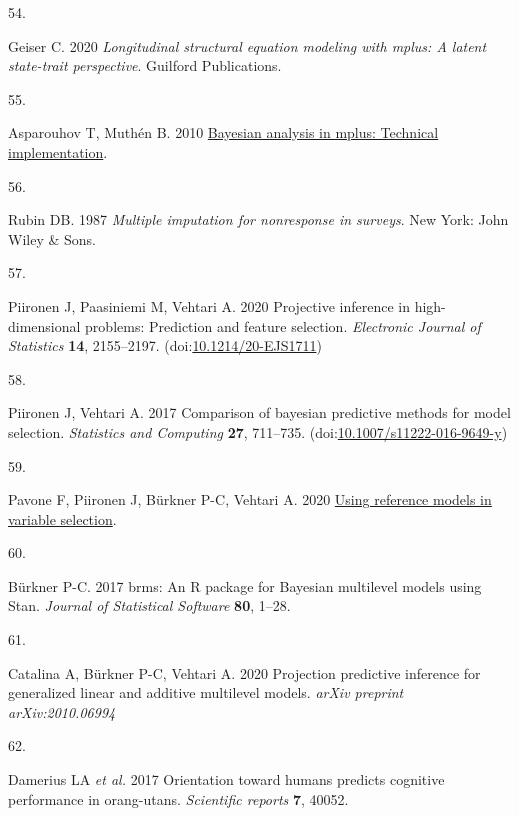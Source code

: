 \documentclass[
  man,floatsintext]{apa6}
\newlength{\cslhangindent}
\newlength{\csllabelwidth}
\newenvironment{CSLReferences}[2] %
 {\begin{list}{}{%
  \setlength{\itemindent}{0pt}
  \setlength{\leftmargin}{0pt}
  \setlength{\parsep}{0pt}
  \ifodd #1
   \setlength{\leftmargin}{\cslhangindent}
   \setlength{\itemindent}{-1\cslhangindent}
  \fi
  \setlength{\itemsep}{#2\baselineskip}}}
 {\end{list}}
\newcommand{\CSLLeftMargin}[1]{\parbox[t]{\csllabelwidth}{\strut#1\strut}}
\newcommand{\CSLRightInline}[1]{\parbox[t]{\linewidth - \csllabelwidth}{\strut#1\strut}}
\begin{document}
\begin{CSLReferences}{0}{1}
\CSLLeftMargin{54. }%
\CSLRightInline{Geiser C. 2020 \emph{Longitudinal structural equation modeling with mplus: A latent state-trait perspective}. Guilford Publications. }

\CSLLeftMargin{55. }%
\CSLRightInline{Asparouhov T, Muthén B. 2010 \href{http://www.statmodel.com/download/Bayes3.pdf}{Bayesian analysis in mplus: Technical implementation}. }

\CSLLeftMargin{56. }%
\CSLRightInline{Rubin DB. 1987 \emph{Multiple imputation for nonresponse in surveys}. New York: John Wiley \& Sons. }

\CSLLeftMargin{57. }%
\CSLRightInline{Piironen J, Paasiniemi M, Vehtari A. 2020 {Projective inference in high-dimensional problems: Prediction and feature selection}. \emph{Electronic Journal of Statistics} \textbf{14}, 2155--2197. (doi:\href{https://doi.org/10.1214/20-EJS1711}{10.1214/20-EJS1711})}

\CSLLeftMargin{58. }%
\CSLRightInline{Piironen J, Vehtari A. 2017 Comparison of bayesian predictive methods for model selection. \emph{Statistics and Computing} \textbf{27}, 711--735. (doi:\href{https://doi.org/10.1007/s11222-016-9649-y}{10.1007/s11222-016-9649-y})}

\CSLLeftMargin{59. }%
\CSLRightInline{Pavone F, Piironen J, Bürkner P-C, Vehtari A. 2020 \href{https://arxiv.org/abs/2004.13118}{Using reference models in variable selection}. }

\CSLLeftMargin{60. }%
\CSLRightInline{Bürkner P-C. 2017 {brms}: An {R} package for {Bayesian} multilevel models using {Stan}. \emph{Journal of Statistical Software} \textbf{80}, 1--28.}

\CSLLeftMargin{61. }%
\CSLRightInline{Catalina A, Bürkner P-C, Vehtari A. 2020 Projection predictive inference for generalized linear and additive multilevel models. \emph{arXiv preprint arXiv:2010.06994} }

\CSLLeftMargin{62. }%
\CSLRightInline{Damerius LA \emph{et al.} 2017 Orientation toward humans predicts cognitive performance in orang-utans. \emph{Scientific reports} \textbf{7}, 40052.}


\end{CSLReferences}
\end{document}
